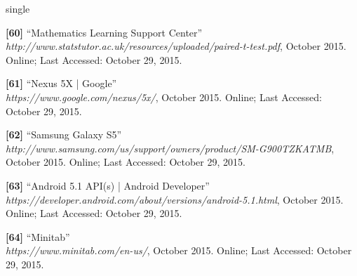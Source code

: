 \documentclass[12pt]{uthesis-v12}  %
\begin{document}
\begin{referencelist}{single}
	\item \textbf{[60]} ``Mathematics Learning Support Center''
	\\\emph{http://www.statstutor.ac.uk/resources/uploaded/paired-t-test.pdf}, October 2015. 
	Online; Last Accessed: October 29, 2015.

	\item \textbf{[61]} ``Nexus 5X | Google''
	\\\emph{https://www.google.com/nexus/5x/}, October 2015. 
	Online; Last Accessed: October 29, 2015.

	\item \textbf{[62]} ``Samsung Galaxy S5''
	\\\emph{http://www.samsung.com/us/support/owners/product/SM-G900TZKATMB}, October 2015. 
	Online; Last Accessed: October 29, 2015.
																		
	\item \textbf{[63]} ``Android 5.1 API(s) | Android Developer''
	\\\emph{https://developer.android.com/about/versions/android-5.1.html}, October 2015. 
	Online; Last Accessed: October 29, 2015.	

	\item \textbf{[64]} ``Minitab''
	\\\emph{https://www.minitab.com/en-us/}, October 2015. 
	Online; Last Accessed: October 29, 2015.				
																				
\end{referencelist}



\end{document}
